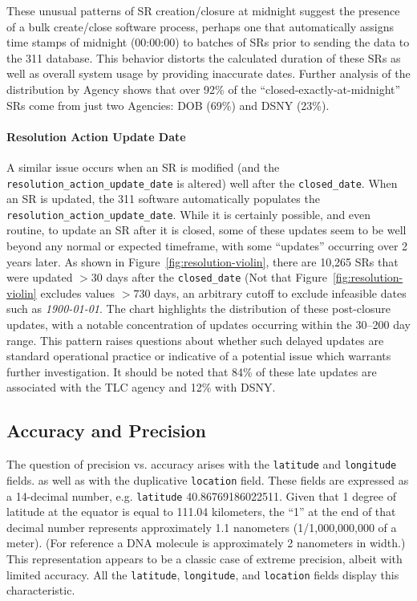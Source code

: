 \documentclass[linenumber]{jdsart}
\begin{document}
These unusual patterns of SR creation/closure at midnight 
suggest the presence of a bulk create/close software process, perhaps one
that automatically assigns time stamps of midnight (00:00:00) to 
 batches of SRs prior to sending the data to the 311 
database. This behavior distorts the calculated duration of these 
SRs as well as overall system usage by providing inaccurate 
dates. Further analysis of the distribution by Agency shows that over 92\% of 
the ``closed-exactly-at-midnight'' SRs come from just two 
Agencies: DOB (69\%) and DSNY  (23\%).


\paragraph{Resolution Action Update Date}
A similar issue occurs when an SR is modified (and the \texttt{resolution\_action\_update\_date} is altered) well 
after the \texttt{closed\_date}.  When an SR is 
updated, the 311 software automatically populates the \texttt{resolution\_action\_update\_date}. While it is certainly 
possible, and even routine, to update an SR after it is closed, 
some of these updates seem to be well beyond any 
normal or expected timeframe, with some ``updates'' 
occurring over 2 years later. As shown in Figure~\ref{fig:resolution-violin}, 
there are 10,265 SRs that were updated $>30$ days after the 
\texttt{closed\_date} (Not that Figure~\ref{fig:resolution-violin} excludes 
values $>730$ days, an arbitrary cutoff to exclude 
infeasible dates such as \textit{1900-01-01}. The chart 
highlights the distribution of these post-closure 
 updates, with a notable concentration of updates occurring within 
the 30--200 day range. This pattern raises 
questions about whether such delayed updates are standard 
operational practice or indicative of a potential issue 
which warrants further investigation. It should be noted
that 84\% of these late updates are associated with the TLC agency
and 12\% with DSNY.


\subsection{Accuracy and Precision}
\label{sec:precision}
The question of precision vs. accuracy arises with the \texttt{latitude} 
and \texttt{longitude} fields. as well as with the duplicative 
\texttt{location} field. These fields are expressed as
a 14-decimal number, e.g. \texttt{latitude} 40.86769186022511. 
Given that 1 degree of latitude at the equator is equal to 111.04 
kilometers, the ``1'' at the end of that decimal number represents 
approximately 1.1 nanometers (1/1,000,000,000 of a meter). (For 
reference a DNA molecule is approximately 2 nanometers in width.) This 
representation appears to be a classic case of extreme precision, albeit with limited 
accuracy. All the \texttt{latitude}, \texttt{longitude}, and \texttt{location}
fields display this characteristic. 
\end{document}
